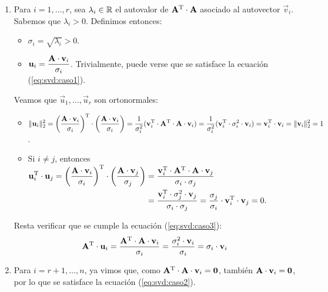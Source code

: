 \begin{enumerate}[label=(\roman*)]
\item Para $i = 1, \dots, r$, sea $\lambda_i \in \mathbb{R}$
    el autovalor de $\mathbf{A}^{\mathrm{T}} \cdot \mathbf{A}$
    asociado al autovector $\vec{v}_i$.
    Sabemos que $\lambda_i > 0$.
    Definimos entonces:
    \begin{itemize}
    \item $\sigma_i = \sqrt{\lambda_i} > 0$.
    \item $\displaystyle \mathbf{u}_i = \frac{\mathbf{A} \cdot \mathbf{v}_i}{\sigma_i}$.
        Trivialmente, puede verse que se satisface la ecuación
        (\ref{eq:svd:caso1}).
    \end{itemize}

    Veamos que $\vec{u}_1, \dots, \vec{u}_r$ son ortonormales:
    \begin{itemize}
    \item $\displaystyle \lVert \mathbf{u}_i \rVert_2^2
        = \left( \frac{\mathbf{A} \cdot \mathbf{v}_i}{\sigma_i} \right)^{\mathrm{T}} \cdot
          \left( \frac{\mathbf{A} \cdot \mathbf{v}_i}{\sigma_i} \right)
        = \frac{1}{\sigma_i^2} (\mathbf{v}_i^{\mathrm{T}} \cdot \mathbf{A}^{\mathrm{T}}
          \cdot \mathbf{A} \cdot \mathbf{v}_i)
        = \frac{1}{\sigma_i^2} (\mathbf{v}_i^{\mathrm{T}} \cdot \sigma_i^2
          \cdot \mathbf{v}_i)
        = \mathbf{v}_i^{\mathrm{T}} \cdot \mathbf{v}_i
        = \lVert \mathbf{v}_i \rVert_2^2
        = 1$.
    \item Si $i \neq j$, entonces $\begin{aligned}[t]
        \displaystyle \mathbf{u}_i^{\mathrm{T}} \cdot \mathbf{u}_j
        = \left( \frac{\mathbf{A} \cdot \mathbf{v}_i}{\sigma_i} \right)^{\mathrm{T}} \cdot
          \left( \frac{\mathbf{A} \cdot \mathbf{v}_j}{\sigma_j} \right)
        &= \frac{\mathbf{v}_i^{\mathrm{T}} \cdot \mathbf{A}^{\mathrm{T}} \cdot \mathbf{A}
          \cdot \mathbf{v}_j}{\sigma_i \cdot \sigma_j} \\
        &= \frac{\mathbf{v}_i^{\mathrm{T}} \cdot \sigma_j^2 \cdot \mathbf{v}_j}
          {\sigma_i \cdot \sigma_j}
        = \frac{\sigma_j}{\sigma_i} \cdot \mathbf{v}_i^{\mathrm{T}} \cdot \mathbf{v}_j
        = 0. \end{aligned}$
    \end{itemize}

    Resta verificar que se cumple la ecuación (\ref{eq:svd:caso3}):
    \[ \mathbf{A}^{\mathrm{T}} \cdot \mathbf{u}_i
        = \frac{\mathbf{A}^{\mathrm{T}} \cdot \mathbf{A} \cdot \mathbf{v}_i}{\sigma_i}
        = \frac{\sigma_i^2 \cdot \mathbf{v}_i}{\sigma_i}
        = \sigma_i \cdot \mathbf{v}_i \]

\item Para $i = r+1, \dots, n$, ya vimos que, como $\mathbf{A}^{\mathrm{T}} \cdot
    \mathbf{A} \cdot \mathbf{v}_i = \mathbf{0}$, también $\mathbf{A} \cdot \mathbf{v}_i
    = \mathbf{0}$, por lo que se satisface la ecuación (\ref{eq:svd:caso2}).


\end{enumerate}
